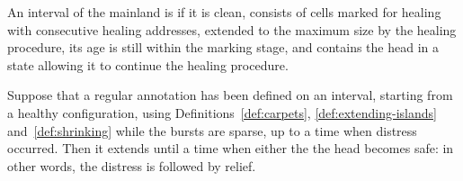 \documentclass[12pt]{memoir}
\begin{document}
\begin{definition} 
An interval of the mainland is  if it is clean, consists of cells marked for
healing with consecutive healing addresses, extended to the maximum size by the
healing procedure, its age is still within the marking stage, and contains the
head in a state allowing it to continue the healing procedure.
\end{definition}

\begin{lemma}[Relief]\label{lem:relief} Suppose that a regular annotation has been defined
on an interval, starting from a healthy configuration,
using Definitions~\ref{def:carpets}, \ref{def:extending-islands} and~\ref{def:shrinking}
while the bursts are sparse, up to a time when distress occurred.
Then it extends until a time when either the the head becomes safe: in other words, the distress
is followed by relief.
\end{lemma}
\end{document}
